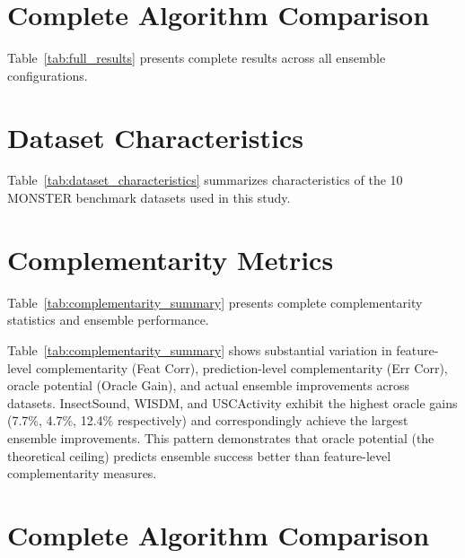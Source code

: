 \documentclass[pdflatex,sn-basic]{sn-jnl}           %
\theoremstyle{thmstyleone}%
\theoremstyle{thmstyletwo}%
\theoremstyle{thmstylethree}%
\begin{document}
\backmatter

\clearpage

\begin{appendices}

\section{Complete Algorithm Comparison}\label{appA}

Table~\ref{tab:full_results} presents complete results across all ensemble configurations.



\clearpage

\section{Dataset Characteristics}\label{appB}

Table~\ref{tab:dataset_characteristics} summarizes characteristics of the 10 MONSTER benchmark datasets used in this study.



\clearpage

\section{Complementarity Metrics}\label{appC}

Table~\ref{tab:complementarity_summary} presents complete complementarity statistics and ensemble performance.



Table~\ref{tab:complementarity_summary} shows substantial variation in feature-level complementarity (Feat Corr), prediction-level complementarity (Err Corr), oracle potential (Oracle Gain), and actual ensemble improvements across datasets. InsectSound, WISDM, and USCActivity exhibit the highest oracle gains (7.7\%, 4.7\%, 12.4\% respectively) and correspondingly achieve the largest ensemble improvements. This pattern demonstrates that oracle potential (the theoretical ceiling) predicts ensemble success better than feature-level complementarity measures.

\clearpage

\section{Complete Algorithm Comparison}\label{appD}


\end{appendices}
\end{document}
